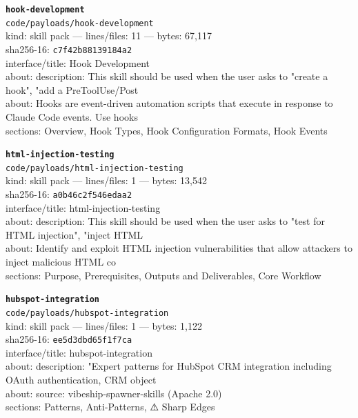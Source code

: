 \noindent\textbf{\texttt{hook-development}}\\
\texttt{code/payloads/hook-development}\\
kind: skill pack --- lines/files: 11 --- bytes: 67,117\\
sha256-16: \texttt{c7f42b88139184a2}\\
interface/title: Hook Development\\
about: description: This skill should be used when the user asks to "create a hook", "add a PreToolUse/Post\\
about: Hooks are event-driven automation scripts that execute in response to Claude Code events. Use hooks \\
sections: Overview, Hook Types, Hook Configuration Formats, Hook Events\\
\vspace*{6.0pt}

\noindent\textbf{\texttt{html-injection-testing}}\\
\texttt{code/payloads/html-injection-testing}\\
kind: skill pack --- lines/files: 1 --- bytes: 13,542\\
sha256-16: \texttt{a0b46c2f546edaa2}\\
interface/title: html-injection-testing\\
about: description: This skill should be used when the user asks to "test for HTML injection", "inject HTML\\
about: Identify and exploit HTML injection vulnerabilities that allow attackers to inject malicious HTML co\\
sections: Purpose, Prerequisites, Outputs and Deliverables, Core Workflow\\
\vspace*{6.0pt}

\noindent\textbf{\texttt{hubspot-integration}}\\
\texttt{code/payloads/hubspot-integration}\\
kind: skill pack --- lines/files: 1 --- bytes: 1,122\\
sha256-16: \texttt{ee5d3dbd65f1f7ca}\\
interface/title: hubspot-integration\\
about: description: "Expert patterns for HubSpot CRM integration including OAuth authentication, CRM object\\
about: source: vibeship-spawner-skills (Apache 2.0)\\
sections: Patterns, Anti-Patterns, ⚠️ Sharp Edges\\
\vspace*{6.0pt}
\newpage

